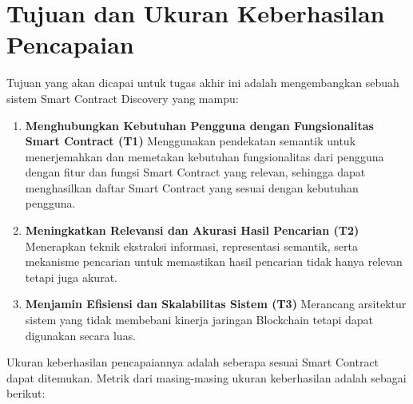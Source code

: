 \section{Tujuan dan Ukuran Keberhasilan Pencapaian}
\label{sec:tujuan-ukuran-keberhasilan-pencapaian}


Tujuan yang akan dicapai untuk tugas akhir ini adalah mengembangkan sebuah sistem Smart Contract Discovery yang mampu: 

\begin{enumerate}
  \item \textbf{Menghubungkan Kebutuhan Pengguna dengan Fungsionalitas Smart Contract (T1)} \newline
  Menggunakan pendekatan semantik untuk menerjemahkan dan memetakan kebutuhan fungsionalitas dari pengguna dengan fitur dan fungsi Smart Contract yang relevan, sehingga dapat menghasilkan daftar Smart Contract yang sesuai dengan kebutuhan pengguna.
  \item \textbf{Meningkatkan Relevansi dan Akurasi Hasil Pencarian (T2)} \newline
  Menerapkan teknik ekstraksi informasi, representasi semantik, serta mekanisme pencarian untuk memastikan hasil pencarian tidak hanya relevan tetapi juga akurat.
  \item \textbf{Menjamin Efisiensi dan Skalabilitas Sistem (T3)} \newline
  Merancang arsitektur sistem yang tidak membebani kinerja jaringan Blockchain tetapi dapat digunakan secara luas.
\end{enumerate}


Ukuran keberhasilan pencapaiannya adalah seberapa sesuai Smart Contract dapat ditemukan. Metrik dari masing-masing ukuran keberhasilan adalah sebagai berikut:

